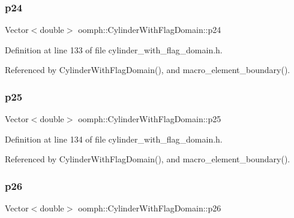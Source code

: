 \subsubsection{\texorpdfstring{p24}{p24}}
{\footnotesize\ttfamily Vector$<$double$>$ oomph\+::\+Cylinder\+With\+Flag\+Domain\+::p24\hspace{0.3cm}{\ttfamily [private]}}



Definition at line 133 of file cylinder\+\_\+with\+\_\+flag\+\_\+domain.\+h.



Referenced by Cylinder\+With\+Flag\+Domain(), and macro\+\_\+element\+\_\+boundary().

\mbox{\label{classoomph_1_1CylinderWithFlagDomain_abbcbd7a97f86134091e3750f04a3fdfd}} 
\subsubsection{\texorpdfstring{p25}{p25}}
{\footnotesize\ttfamily Vector$<$double$>$ oomph\+::\+Cylinder\+With\+Flag\+Domain\+::p25\hspace{0.3cm}{\ttfamily [private]}}



Definition at line 134 of file cylinder\+\_\+with\+\_\+flag\+\_\+domain.\+h.



Referenced by Cylinder\+With\+Flag\+Domain(), and macro\+\_\+element\+\_\+boundary().

\mbox{\label{classoomph_1_1CylinderWithFlagDomain_a85707f0839cd70631c82d9254ed8c5d0}} 
\subsubsection{\texorpdfstring{p26}{p26}}
{\footnotesize\ttfamily Vector$<$double$>$ oomph\+::\+Cylinder\+With\+Flag\+Domain\+::p26\hspace{0.3cm}{\ttfamily [private]}}



